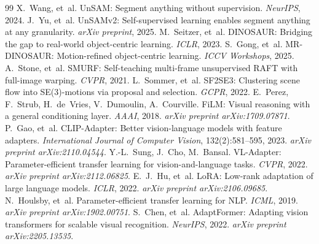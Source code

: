 \documentclass{article}
\begin{document}
\begin{thebibliography}{99}
 X.~Wang, et~al. UnSAM: Segment anything without supervision. \emph{NeurIPS}, 2024.
 J.~Yu, et~al. UnSAMv2: Self-supervised learning enables segment anything at any granularity. \emph{arXiv preprint}, 2025.
 M.~Seitzer, et~al. DINOSAUR: Bridging the gap to real-world object-centric learning. \emph{ICLR}, 2023.
 S.~Gong, et~al. MR-DINOSAUR: Motion-refined object-centric learning. \emph{ICCV Workshops}, 2025.
 A.~Stone, et~al. SMURF: Self-teaching multi-frame unsupervised RAFT with full-image warping. \emph{CVPR}, 2021.
 L.~Sommer, et~al. SF2SE3: Clustering scene flow into SE(3)-motions via proposal and selection. \emph{GCPR}, 2022.
 E.~Perez, F.~Strub, H.~de~Vries, V.~Dumoulin, A.~Courville. FiLM: Visual reasoning with a general conditioning layer. \emph{AAAI}, 2018. \emph{arXiv preprint arXiv:1709.07871}.
 P.~Gao, et~al. CLIP-Adapter: Better vision-language models with feature adapters. \emph{International Journal of Computer Vision}, 132(2):581--595, 2023. \emph{arXiv preprint arXiv:2110.04544}.
 Y.-L.~Sung, J.~Cho, M.~Bansal. VL-Adapter: Parameter-efficient transfer learning for vision-and-language tasks. \emph{CVPR}, 2022. \emph{arXiv preprint arXiv:2112.06825}.
 E.~J.~Hu, et~al. LoRA: Low-rank adaptation of large language models. \emph{ICLR}, 2022. \emph{arXiv preprint arXiv:2106.09685}.
 N.~Houlsby, et~al. Parameter-efficient transfer learning for NLP. \emph{ICML}, 2019. \emph{arXiv preprint arXiv:1902.00751}.
 S.~Chen, et~al. AdaptFormer: Adapting vision transformers for scalable visual recognition. \emph{NeurIPS}, 2022. \emph{arXiv preprint arXiv:2205.13535}.
\end{thebibliography}

\clearpage
\appendix
\renewcommand{\thefigure}{\Alph{section}.\arabic{figure}}
\renewcommand{\thetable}{\Alph{section}.\arabic{table}}
\makeatletter
\renewcommand{\paragraph}[1]{\par\smallskip\noindent\textit{#1}\hspace{0.5em}\ignorespaces}
\makeatother
\end{document}
